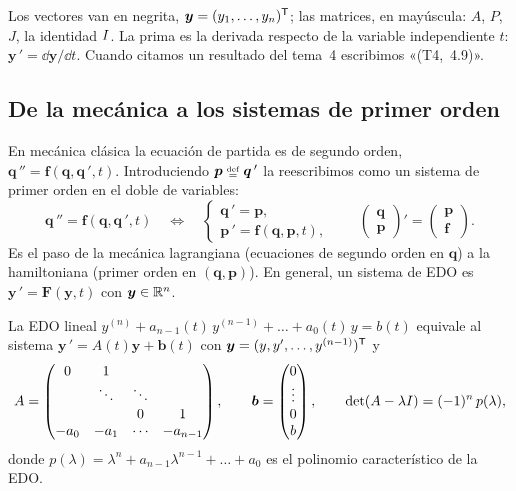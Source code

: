 \documentclass[11pt,twoside]{article}
\newcommand\vy{\bm{y}}
\newcommand\vb{\bm{b}}
\newcommand\vF{\bm{F}}
\newcommand\vp{\bm{p}}
\newcommand\vq{\bm{q}}
\newcommand\mat[1]{\begin{pmatrix}#1\end{pmatrix}}
\begin{document}
\begin{observacion}[notación]
Los vectores van en negrita, $\vy=(y_1,\dots,y_n)\T$; las matrices, en mayúscula: $A$, $P$, $J$, la identidad
$I$. La prima es la derivada respecto de la variable independiente $t$: $\vy\,'=\dd\vy/\dd t$. Cuando citamos un
resultado del tema~4 escribimos «(T4,~4.9)».
\end{observacion}

\subsection{De la mecánica a los sistemas de primer orden}

En mecánica clásica la ecuación de partida es de segundo orden, $\vq\,''=\bm f(\vq,\vq\,',t)$. Introduciendo
$\vp\defeq\vq\,'$ la reescribimos como un sistema de primer orden en el doble de variables:
\begin{equation}\label{eq:hamilton}
\vq\,''=\bm f(\vq,\vq\,',t)
\quad\Longleftrightarrow\quad
\begin{cases}\vq\,'=\vp,\\ \vp\,'=\bm f(\vq,\vp,t),\end{cases}
\qquad
\mat{\vq\\ \vp}'=\mat{\vp\\ \bm f}.
\end{equation}
Es el paso de la mecánica lagrangiana (ecuaciones de segundo orden en $\vq$) a la hamiltoniana (primer orden en
$(\vq,\vp)$). En general, un sistema de EDO es $\vy\,'=\vF(\vy,t)$ con $\vy\in\R^n$.

\begin{proposicion}\label{prop:companera}
La EDO lineal $y^{(n)}+a_{n-1}(t)\,y^{(n-1)}+\dots+a_0(t)\,y=b(t)$ equivale al sistema $\vy\,'=A(t)\vy+\vb(t)$ con
$\vy=(y,y',\dots,y^{(n-1)})\T$ y
\begin{equation}\label{eq:companera}
A=\mat{0&1&&\\ &\ddots&\ddots&\\ &&0&1\\ -a_0&-a_1&\cdots&-a_{n-1}},\qquad
\vb=\mat{0\\ \vdots\\ 0\\ b},\qquad
\det(A-\lambda\Id)=(-1)^n\,p(\lambda),
\end{equation}
donde $p(\lambda)=\lambda^n+a_{n-1}\lambda^{n-1}+\dots+a_0$ es el polinomio característico de la EDO.
\end{proposicion}
\end{document}

